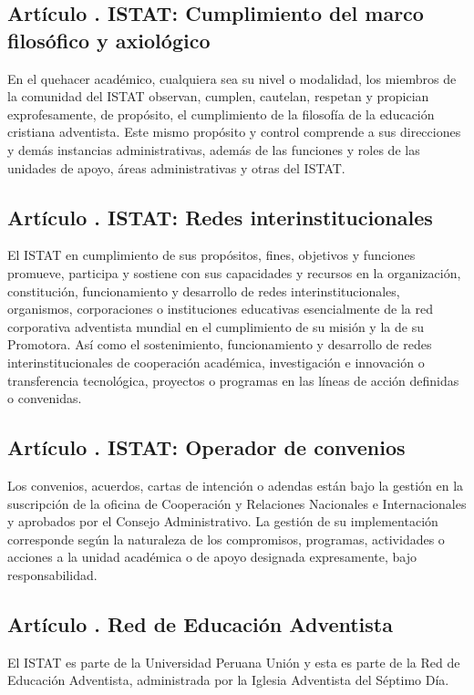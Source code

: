 \subsection{Artículo . ISTAT: Cumplimiento del marco filosófico y axiológico}
\addtocounter{ns}{1}
En el quehacer académico, cualquiera sea su nivel o modalidad, los miembros de la comunidad del ISTAT observan, cumplen, cautelan, respetan y propician exprofesamente, de propósito, el cumplimiento de la filosofía de la educación cristiana adventista. Este mismo propósito y control comprende a sus direcciones y demás instancias administrativas, además de las funciones y roles de las unidades de apoyo, áreas administrativas y otras del ISTAT. 
\subsection{Artículo . ISTAT: Redes interinstitucionales}
\addtocounter{ns}{1}
El ISTAT en cumplimiento de sus propósitos, fines, objetivos y funciones promueve, participa y sostiene con sus capacidades y recursos en la organización, constitución, funcionamiento y desarrollo de redes interinstitucionales, organismos, corporaciones o instituciones educativas esencialmente de la red corporativa adventista mundial en el cumplimiento de su misión y la de su Promotora. Así como el sostenimiento, funcionamiento y desarrollo de redes interinstitucionales de cooperación académica, investigación e innovación o transferencia tecnológica, proyectos o programas en las líneas de acción definidas o convenidas. 
\subsection{Artículo . ISTAT: Operador de convenios}
\addtocounter{ns}{1}
Los convenios, acuerdos, cartas de intención o adendas están bajo la gestión en la suscripción de la oficina de Cooperación y Relaciones Nacionales e Internacionales y aprobados por el Consejo Administrativo. La gestión de su implementación corresponde según la naturaleza de los compromisos, programas, actividades o acciones a la unidad académica o de apoyo designada expresamente, bajo responsabilidad. 
\subsection{Artículo . Red de Educación Adventista}
\addtocounter{ns}{1}
El ISTAT es parte de la Universidad Peruana Unión y esta es parte de la Red de Educación Adventista, administrada por la Iglesia Adventista del Séptimo Día.

